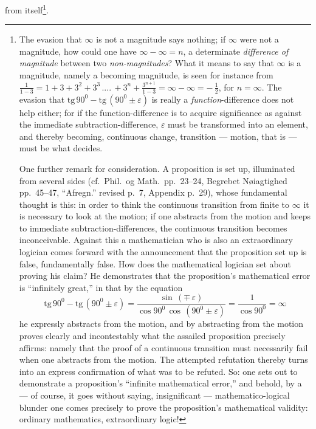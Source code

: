 \documentclass[12pt,a4paper]{book}
\begin{document}
from itself\footnote{The evasion that $\infty$ is not a magnitude says nothing;
if $\infty$ were not a magnitude, how could one have $\infty - \infty = n$, a
determinate \emph{difference of magnitude} between two
\emph{non-magnitudes}? What it means to say that $\infty$ is a magnitude,
namely a becoming magnitude, is seen for instance from $\frac{1}{1-3}
= 1 + 3 + 3^{2} + 3^{3}\,....\,+ 3^{n} + \frac{3^{n+1}}{1-3} =
\infty - \infty = -\,\frac{1}{2}$, for $n = \infty$. The evasion that
$\mathrm{tg}\,90^{0} - \mathrm{tg}\,(90^{0} \pm \varepsilon)$ is
really a \emph{function}-difference does not help either; for if the
function-difference is to acquire significance as against the immediate
subtraction-difference, $\varepsilon$ must be transformed into an element, and
thereby becoming, continuous change, transition --- motion, that is --- must be
what decides.
\par One further remark for consideration. A proposition is set up, illuminated
from several sides (cf.\ Phil.\ og Math.\ pp.~23--24, Begrebet Nøiagtighed
pp.~45--47, ``Afregn.'' revised p.~7, Appendix p.~29), whose fundamental
thought is this: in order to think the continuous transition from finite to
$\infty$ it is necessary to look at the motion; if one abstracts from the
motion and keeps to immediate subtraction-differences, the continuous
transition becomes inconceivable. Against this a mathematician who is also an
extraordinary logician comes forward with the announcement that the proposition
set up is false, fundamentally false. How does the mathematical logician set
about proving his claim? He demonstrates that the proposition's mathematical
error is ``infinitely great,'' in that by the equation
\[ \mathrm{tg}\,90^{0} - \mathrm{tg}\,(90^{0} \pm \varepsilon) =
\frac{\sin\,(\mp\,\varepsilon)}{\cos 90^{0}\,\cos\,(90^{0} \pm
\varepsilon)} = \frac{1}{\cos 90^{0}} = \infty \]
he expressly abstracts from the motion, and by abstracting from the motion
proves clearly and incontestably what the assailed proposition precisely
affirms: namely that the proof of a continuous transition must necessarily
fail when one abstracts from the motion. The attempted refutation thereby turns
into an express confirmation of what was to be refuted. So: one sets out to
demonstrate a proposition's ``infinite mathematical error,'' and behold, by a
--- of course, it goes without saying, insignificant --- mathematico-logical
blunder one comes precisely to prove the proposition's mathematical validity:
ordinary mathematics, extraordinary logic!}.
\end{document}
